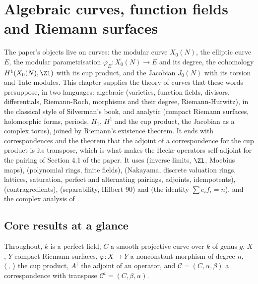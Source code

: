 \chapter{Algebraic curves, function fields and Riemann surfaces}\label{ch:curves}

The paper's objects live on curves: the modular curve $X_0(N)$, the elliptic curve $E$, the modular parametrisation $\varphi_E\colon X_0(N)\to E$ and its degree, the
cohomology $H^1(X_0(N),\Zl)$ with its cup product, and the Jacobian $J_0(N)$ with its torsion and Tate modules. This chapter supplies the theory of curves that these
words presuppose, in two languages: algebraic (varieties, function fields, divisors, differentials, Riemann-Roch, morphisms and their degree, Riemann-Hurwitz), in the
classical style of Silverman's book, and analytic (compact Riemann surfaces, holomorphic forms, periods, $H_1$, $H^1$ and the cup product, the Jacobian as a complex
torus), joined by Riemann's existence theorem. It ends with correspondences and the theorem that the adjoint of a correspondence for the cup product is its
transpose, which is what makes the Hecke operators self-adjoint for the pairing of Section 4.1 of the paper. It uses  (inverse limits, $\Zl$, Moebius
maps),  (polynomial rings, finite fields),  (Nakayama, discrete valuation rings, lattices, saturation, perfect and alternating pairings,
adjoints, idempotents),  (contragredients),  (separability, Hilbert 90) and  (the identity $\sum e_if_i=n$), and the complex
analysis of .

\section*{Core results at a glance}

Throughout, $k$ is a perfect field, $C$ a smooth projective curve over $k$ of genus $g$, $X$, $Y$ compact Riemann surfaces, $\varphi\colon X\to Y$ a nonconstant morphism of
degree $n$, $\langle\ ,\ \rangle$ the cup product, $A^\dagger$ the adjoint of an operator, and $\mathcal C=(C,\alpha,\beta)$ a correspondence with transpose $\mathcal C^t=(C,\beta,\alpha)$.

